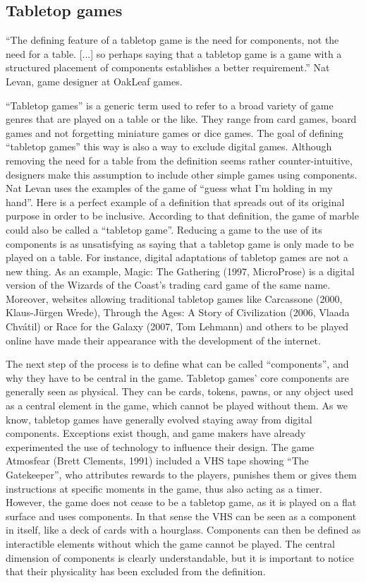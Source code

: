 \subsection{Tabletop games}

“The defining feature of a tabletop game is the need for components, not the need for a table. [...] so perhaps saying that a tabletop game is a game with a structured placement of components establishes a better requirement.” Nat Levan, game designer at OakLeaf games.

“Tabletop games” is a generic term used to refer to a broad variety of game genres that are played on a table or the like. They range from card games, board games and not forgetting miniature games or dice games. The goal of defining “tabletop games” this way is also a way to exclude digital games. Although removing the need for a table from the definition seems rather counter-intuitive, designers make this assumption to include other simple games using components. Nat Levan uses the examples of the game of “guess what I’m holding in my hand”. Here is a perfect example of a definition that spreads out of its original purpose in order to be inclusive. According to that definition, the game of marble could also be called a “tabletop game”. Reducing a game to the use of its components is as unsatisfying as saying that a tabletop game is only made to be played on a table. For instance, digital adaptations of tabletop games are not a new thing. As an example, Magic: The Gathering (1997, MicroProse) is a digital version of the Wizards of the Coast’s trading card game of the same name. Moreover, websites allowing traditional tabletop games like Carcassone (2000, Klaus-Jürgen Wrede), Through the Ages: A Story of Civilization (2006, Vlaada Chvátil) or Race for the Galaxy (2007, Tom Lehmann) and others to be played online have made their appearance with the development of the internet. 

The next step of the process is to define what can be called “components”, and why they have to be central in the game. Tabletop games’ core components are generally seen as physical. They can be cards, tokens, pawns, or any object used as a central element in the game, which cannot be played without them.  As we know, tabletop games have generally evolved staying away from digital components. Exceptions exist though, and game makers have already experimented the use of technology to influence their design. The game Atmosfear (Brett Clements, 1991) included a VHS tape showing “The Gatekeeper”, who attributes rewards to the players, punishes them or gives them instructions at specific moments in the game, thus also acting as a timer. However, the game does not cease to be a tabletop game, as it is played on a flat surface and uses components. In that sense the VHS can be seen as a component in itself, like a deck of cards with a hourglass. 
Components can then be defined as interactible elements without which the game cannot be played. The central dimension of components is clearly understandable, but it is important to notice that their physicality has been excluded from the definition.

